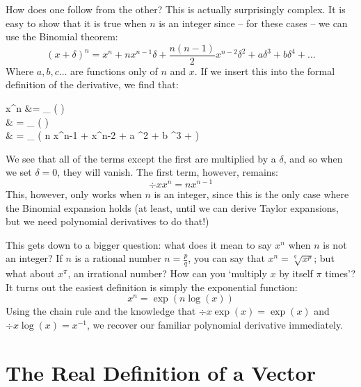 \documentclass[a4paper,openany,11pt]{book}
\begin{document}
			How does one follow from the other? This is actually surprisingly complex. It is easy to show that it is true when $n$ is an integer since -- for these cases -- we can use the Binomial theorem:
			\begin{equation}
				\left(x + \delta\right)^n = x^n + n x^{n-1} \delta + \frac{n(n-1)}{2} x^{n-2} \delta^2 + a \delta^3  + b \delta^4 + \hdots
			\end{equation}
			Where $a, b, c\hdots$ are functions only of $n$ and $x$. If we insert this into the formal definition of the derivative, we find that:
			\begin{spalign}
				 x^n &= \lim_{\delta {}} \left( \right)
				\\
				& = \lim_{\delta {}} \left( \frac{\left[x^n + n x^{n-1} \delta + \frac{n(n-1)}{2} x^{n-2} \delta^2 + a \delta^3 + b\delta^4 + \hdots\right] - x^n}{\delta }\right)
				\\
				& = \lim_{\delta {}} \left( n x^{n-1} +  x^{n-2} \delta + a \delta^2 + b \delta^3 + \hdots\right)
			\end{spalign}
			We see that all of the terms except the first are multiplied by a $\delta$, and so when we set $\delta =0$, they will vanish. The first term, however, remains:
			\begin{equation}
				\div{}{x} x^n = n x^{n-1}
			\end{equation}
			This, however, only works when $n$ is an integer, since this is the only case where the Binomial expansion holds (at least, until we can derive Taylor expansions, but we need polynomial derivatives to do that!)

			This gets down to a bigger question: what does it mean to say $x^n$ when $n$ is not an integer? If $n$ is a rational number $n = \frac{p}{q}$, you can say that $x^n = \sqrt[q]{x^p}$; but what about $x^\pi$, an irrational number? How can you `multiply $x$ by itself $\pi$ times'? It turns out the easiest definition is simply the exponential function:
			\begin{equation}
				x^n = \exp\left(n \log(x)\right)
			\end{equation}
			Using the chain rule and the knowledge that $\div{}{x} \exp(x) = \exp(x)$ and $\div{}{x} \log(x) = x^{-1}$, we recover our familiar polynomial derivative immediately.

		\chapter{The Real Definition of a Vector}\label{Int:VectorSpace}
\end{document}
